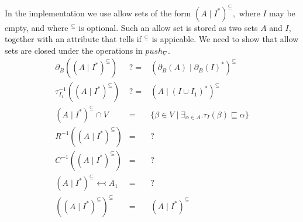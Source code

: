\documentclass{article}
\begin{document}
In the implementation we use allow sets of the form $\left( A\mid I^{\ast
}\right) ^{\subseteq },$ where $I$ may be empty, and where $^{\subseteq }$
is optional. Such an allow set is stored as two sets $A$ and $I$, together
with an attribute that tells if $^{\subseteq }$ is appicable. We need to
show that allow sets are closed under the operations in $push_{\nabla }$.%
\[
\begin{array}{lll}
\partial _{B}(\left( A\mid I^{\ast }\right) ^{\subseteq }) & ?= & \left(
\partial _{B}(A)\mid \partial _{B}(I)^{\ast }\right) ^{\subseteq } \\ 
\tau _{I_{1}}^{-1}\left( \left( A\mid I^{\ast }\right) ^{\subseteq }\right)
& ?= & \left( A\mid \left( I\cup I_{1}\right) ^{\ast }\right) ^{\subseteq }
\\ 
\left( A\mid I^{\ast }\right) ^{\subseteq }\cap V & = & \{\beta \in V\mid
\exists _{\alpha \in A}.\tau _{I}(\beta )\sqsubseteq \alpha \} \\ 
R^{-1}\left( \left( A\mid I^{\ast }\right) ^{\subseteq }\right) & = & ? \\ 
C^{-1}\left( \left( A\mid I^{\ast }\right) ^{\subseteq }\right) & = & ? \\ 
\left( A\mid I^{\ast }\right) ^{\subseteq }\leftarrowtail A_{1} & = & ? \\ 
\left( \left( A\mid I^{\ast }\right) ^{\subseteq }\right) ^{\subseteq } & =
& \left( A\mid I^{\ast }\right) ^{\subseteq }%
\end{array}%
\]
\end{document}
